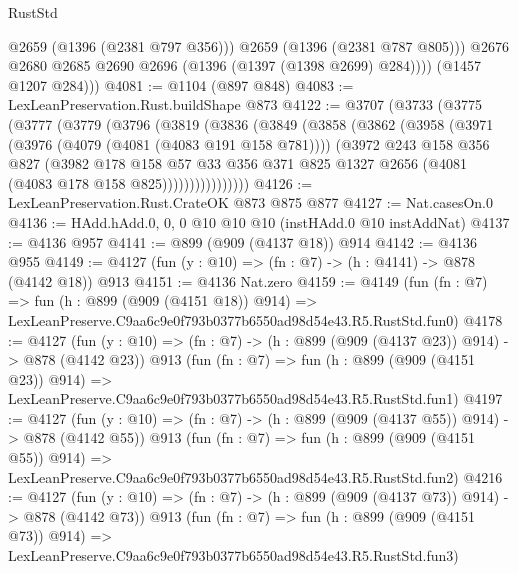 \begin{lexlean}{RustStd}
\begin{coremodule}
                @2659
                (@1396 (@2381 @797 @356)))
              @2659
              (@1396 (@2381 @787 @805)))
            @2676
            @2680
            @2685
            @2690
            @2696
            (@1396 (@1397 (@1398 @2699) @284))))
        (@1457 @1207 @284)))
@4081 := @1104 (@897 @848)
@4083 := LexLeanPreservation.Rust.buildShape @873
@4122 := @3707
    (@3733
      (@3775
        (@3777
          (@3779
            (@3796
              (@3819
                (@3836
                  (@3849
                    (@3858
                      (@3862
                        (@3958
                          (@3971
                            (@3976 (@4079 (@4081 (@4083 @191 @158 @781))))
                            (@3972
                              @243
                              @158
                              @356
                              @827
                              (@3982
                                @178
                                @158
                                @57
                                @33
                                @356
                                @371
                                @825
                                @1327
                                @2656
                                (@4081 (@4083 @178 @158 @825))))))))))))))))
@4126 := LexLeanPreservation.Rust.CrateOK @873 @875 @877
@4127 := Nat.casesOn.{0}
@4136 := HAdd.hAdd.{0, 0, 0} @10 @10 @10 (instHAdd.{0} @10 instAddNat)
@4137 := @4136 @957
@4141 := @899 (@909 (@4137 @18)) @914
@4142 := @4136 @955
@4149 := @4127 (fun (y : @10) => (fn : @7) -> (h : @4141) -> @878 (@4142 @18)) @913
@4151 := @4136 Nat.zero
@4159 := @4149
    (fun (fn : @7) =>
    fun (h : @899 (@909 (@4151 @18)) @914) =>
    LexLeanPreserve.C9aa6c9e0f793b0377b6550ad98d54e43.R5.RustStd.fun0)
@4178 := @4127
    (fun (y : @10) => (fn : @7) -> (h : @899 (@909 (@4137 @23)) @914) -> @878 (@4142 @23))
    @913
    (fun (fn : @7) =>
    fun (h : @899 (@909 (@4151 @23)) @914) =>
    LexLeanPreserve.C9aa6c9e0f793b0377b6550ad98d54e43.R5.RustStd.fun1)
@4197 := @4127
    (fun (y : @10) => (fn : @7) -> (h : @899 (@909 (@4137 @55)) @914) -> @878 (@4142 @55))
    @913
    (fun (fn : @7) =>
    fun (h : @899 (@909 (@4151 @55)) @914) =>
    LexLeanPreserve.C9aa6c9e0f793b0377b6550ad98d54e43.R5.RustStd.fun2)
@4216 := @4127
    (fun (y : @10) => (fn : @7) -> (h : @899 (@909 (@4137 @73)) @914) -> @878 (@4142 @73))
    @913
    (fun (fn : @7) =>
    fun (h : @899 (@909 (@4151 @73)) @914) =>
    LexLeanPreserve.C9aa6c9e0f793b0377b6550ad98d54e43.R5.RustStd.fun3)

\end{coremodule}
\end{lexlean}
